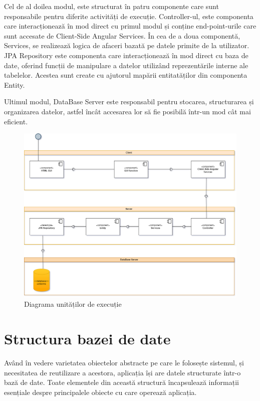 \documentclass[12pt,a4paper]{report}
\theoremstyle{definition}
\theoremstyle{remark}
\begin{document}
\par Cel de al doilea modul, este structurat în patru componente care sunt responsabile pentru diferite activități de execuție. Controller-ul, este componenta care interacționează în mod direct cu primul modul și conține end-point-urile care sunt accesate de  Client-Side Angular Services. În cea de a doua componentă, Services, se realizează logica de afaceri bazată pe datele primite de la utilizator. JPA Repository este componenta care interacționează în mod direct cu baza de date, oferind funcții de manipulare a datelor utilizând reprezentările interne ale tabelelor. Acestea sunt create cu ajutorul mapării entitatăților din componenta Entity.

\par Ultimul modul, DataBase Server este responsabil pentru stocarea, structurarea și organizarea datelor, astfel încât accesarea lor să fie posibilă într-un mod cât mai eficient.

\begin{figure}[H]
    \centering
    \includegraphics[width=0.75\linewidth]{resurse/diagrame/DiagramaDEEXECUTIE.drawio.png}
    \caption{Diagrama unităților de execuție}
\end{figure}

\section{Structura bazei de date}
\par Având în vedere varietatea obiectelor abstracte pe care le folosește sistemul, și necesitatea de reutilizare a acestora, aplicația își are datele structurate într-o bază de date. Toate elementele din această structură încapsulează informații esențiale despre principalele obiecte cu care operează aplicația.
\end{document}
